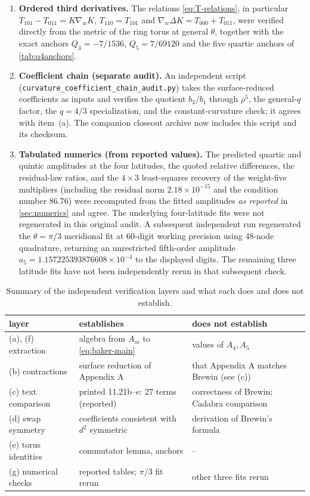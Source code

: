 \documentclass[11pt]{amsart}
\numberwithin{equation}{section}
\theoremstyle{remark}
\begin{document}
\begin{enumerate}[leftmargin=2em,label=(\alph*)]
\item \textbf{Ordered third derivatives.} The relations \eqref{eq:T-relations}, in particular $T_{101}-T_{011}=K\nabla_wK$, $T_{110}=T_{101}$ and $\nabla_w\Delta K=T_{000}+T_{011}$, were verified directly from the metric of the ring torus at general $\theta$, together with the exact anchors $Q_3=-7/1536$, $Q_5=7/69120$ and the five quartic anchors of \cref{tab:q4anchors}.
\item \textbf{Coefficient chain (separate audit).} An independent script (\texttt{curvature\_coefficient\_chain\_audit.py}) takes the surface-reduced coefficients as inputs and verifies the quotient $b_3/b_1$ through $\rho^5$, the general-$q$ factor, the $q=4/3$ specialization, and the constant-curvature check; it agrees with item~(a). The companion closeout archive now includes this script and its checksum.
\item \textbf{Tabulated numerics (from reported values).} The predicted quartic and quintic amplitudes at the four latitudes, the quoted relative differences, the residual-law ratios, and the $4\times3$ least-squares recovery of the weight-five multipliers (including the residual norm $2.18\times10^{-15}$ and the condition number $86.76$) were recomputed from the fitted amplitudes \emph{as reported} in \cref{sec:numerics} and agree. The underlying four-latitude fits were not regenerated in this original audit. A subsequent independent run regenerated the $\theta=\pi/3$ meridional fit at 60-digit working precision using 48-node quadrature, returning an unrestricted fifth-order amplitude $a_5=1.157225393876608\times10^{-4}$ to the displayed digits. The remaining three latitude fits have not been independently rerun in that subsequent check.
\end{enumerate}

\begin{table}[htbp]
\centering
\caption{Summary of the independent verification layers and what each does and does not establish.}
\begin{tabular}{lll}
\toprule
layer & establishes & does not establish\\
\midrule
(a), (f) extraction & algebra from $A_m$ to \eqref{eq:baker-main} & values of $A_4,A_5$\\
(b) contractions & surface reduction of Appendix A & that Appendix A matches Brewin (see (c))\\
(c) text comparison & printed 11.21b--e: 27 terms (reported) & correctness of Brewin; Cadabra comparison\\
(d) swap symmetry & coefficients consistent with $d^2$ symmetric & derivation of Brewin's formula\\
(e) torus identities & commutator lemma, anchors & --\\
(g) numerical checks & reported tables; $\pi/3$ fit rerun & other three fits rerun\\
\bottomrule
\end{tabular}
\end{table}
\end{document}
